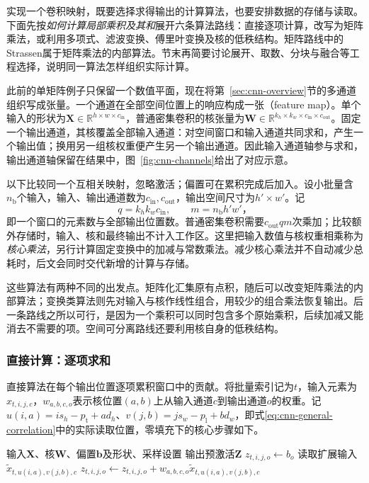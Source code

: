 实现一个卷积映射，既要选择求得输出的计算算法，也要安排数据的存储与读取。下面先按\emph{如何计算局部乘积及其和}展开六条算法路线：直接逐项计算，改写为矩阵乘法，或利用多项式、滤波变换、傅里叶变换及核的低秩结构。矩阵路线中的Strassen属于矩阵乘法的内部算法。节末再简要讨论展开、取数、分块与融合等工程选择，说明同一算法怎样组织实际计算。

此前的单矩阵例子只保留一个数值平面，现在将第~\ref{sec:cnn-overview}节的多通道组织写成张量。一个通道在全部空间位置上的响应构成一张（feature map）。单个输入的形状为$\bm X\in\mathbb R^{h\times w\times c_{\mathrm{in}}}$，普通密集卷积的核张量为$\bm W\in\mathbb R^{k_h\times k_w\times c_{\mathrm{in}}\times c_{\mathrm{out}}}$。固定一个输出通道，其核覆盖全部输入通道：对空间窗口和输入通道共同求和，产生一个输出值；换用另一组核权重便产生另一个输出通道。因此输入通道轴参与求和，输出通道轴保留在结果中，图~\ref{fig:cnn-channels}给出了对应示意。

以下比较同一个互相关映射，忽略激活；偏置可在累积完成后加入。设小批量含$n_{\mathrm b}$个输入，输入、输出通道数为$c_{\mathrm{in}},c_{\mathrm{out}}$，输出空间尺寸为$h'\times w'$。记
\[
  q=k_hk_wc_{\mathrm{in}},\qquad m=n_{\mathrm b}h'w'\text{，}
\]
即一个窗口的元素数与全部输出位置数。普通密集卷积需要$c_{\mathrm{out}}qm$次乘加；比较额外存储时，输入、核和最终输出不计入工作区。这里把输入数值与核权重相乘称为\emph{核心乘法}，另行计算固定变换中的加减与常数乘法。减少核心乘法并不自动减少总耗时，后文会同时交代新增的计算与存储。

这些算法有两种不同的出发点。矩阵化汇集原有点积，随后可以改变矩阵乘法的内部算法；变换类算法则先对输入与核作线性组合，用较少的组合乘法恢复输出。后一条路线之所以可行，是因为一个乘积可以同时包含多个原始乘积，后续加减又能消去不需要的项。空间可分离路线还要利用核自身的低秩结构。

\subsubsection{直接计算：逐项求和}
\label{sec:cnn-direct-implementation}

直接算法在每个输出位置逐项累积窗口中的贡献。将批量索引记为$t$，输入元素为$x_{t,i,j,c}$，$w_{a,b,c,o}$表示核位置$(a,b)$上从输入通道$c$到输出通道$o$的权重。记$u(i,a)=is_h-p_{\mathrm t}+ad_h$、$v(j,b)=js_w-p_{\mathrm l}+bd_w$，即式\eqref{eq:cnn-general-correlation}中的实际读取位置，零填充下的核心步骤如下。
\begin{algorithm}[直接多通道互相关]
  \label{alg:cnn-direct}
  \begin{algorithmic}[1]
    \Require 输入$\bm X$、核$\bm W$、偏置$\bm b$及形状、采样设置
    \Ensure 输出预激活$\bm Z$
      \State $z_{t,i,j,o}\gets b_o$
        \State 读取扩展输入$\widetilde x_{t,u(i,a),v(j,b),c}$
        \State $z_{t,i,j,o}\gets z_{t,i,j,o}+w_{a,b,c,o}\widetilde x_{t,u(i,a),v(j,b),c}$
      \EndFor
    \EndFor
  \end{algorithmic}
\end{algorithm}

